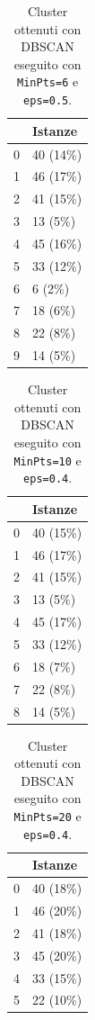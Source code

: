 \documentclass[12pt]{article}
\begin{document}
\begin{table}[H]
\centering
\begin{tabular}{@{}ll@{}}
\toprule
                        & Istanze  \\\midrule
\multicolumn{1}{l}{0} & 40 (14\%)  \\
\multicolumn{1}{l}{1} & 46 (17\%)  \\
\multicolumn{1}{l}{2} & 41 (15\%)  \\
\multicolumn{1}{l}{3} & 13 (5\%)   \\
\multicolumn{1}{l}{4} & 45 (16\%)  \\
\multicolumn{1}{l}{5} & 33 (12\%)  \\
\multicolumn{1}{l}{6} & 6  (2\%)   \\
\multicolumn{1}{l}{7} & 18 (6\%)   \\
\multicolumn{1}{l}{8} & 22 (8\%)   \\
\multicolumn{1}{l}{9} & 14 (5\%)   \\\bottomrule
\end{tabular}
\caption{Cluster ottenuti con DBSCAN eseguito con \texttt{MinPts=6} e \texttt{eps=0.5}.}
\label{tab:dbscan605}
\end{table}
\begin{table}[H]
\centering
\begin{tabular}{@{}ll@{}}
\toprule
                        & Istanze    \\ \midrule
\multicolumn{1}{l}{0}   & 40 (15\%)  \\ 
\multicolumn{1}{l}{1}   & 46 (17\%)  \\ 
\multicolumn{1}{l}{2}   & 41 (15\%)  \\ 
\multicolumn{1}{l}{3}   & 13 (5\%)   \\ 
\multicolumn{1}{l}{4}   & 45 (17\%)  \\ 
\multicolumn{1}{l}{5}   & 33 (12\%)  \\ 
\multicolumn{1}{l}{6}   & 18 (7\%)   \\ 
\multicolumn{1}{l}{7}   & 22 (8\%)   \\ 
\multicolumn{1}{l}{8}   & 14 (5\%)   \\ \bottomrule
\end{tabular}
\caption{Cluster ottenuti con DBSCAN eseguito con \texttt{MinPts=10} e \texttt{eps=0.4}.}
\label{tab:dbscan1004}
\end{table}
\begin{table}[H]
\centering
\begin{tabular}{@{}ll@{}}
\toprule
                        & Istanze  \\ \midrule
\multicolumn{1}{l}{0} & 40 (18\%) \\
\multicolumn{1}{l}{1} & 46 (20\%) \\
\multicolumn{1}{l}{2} & 41 (18\%) \\
\multicolumn{1}{l}{3} & 45 (20\%) \\
\multicolumn{1}{l}{4} & 33 (15\%) \\
\multicolumn{1}{l}{5} & 22 (10\%) \\ \bottomrule
\end{tabular}
\caption{Cluster ottenuti con DBSCAN eseguito con \texttt{MinPts=20} e \texttt{eps=0.4}.}
\label{tab:dbscan2004}
\end{table}
\end{document}
